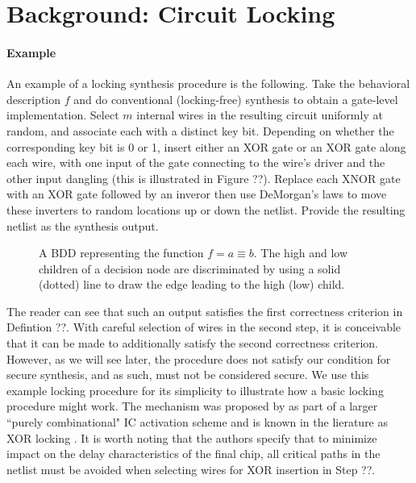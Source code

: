 \section{Background: Circuit Locking}

\paragraph{Example} An example of a locking synthesis procedure is the following. Take the behavioral description $f$ and do conventional (locking-free) synthesis to obtain a gate-level implementation. Select $m$ internal wires in the resulting circuit uniformly at random, and associate each with a distinct key bit. Depending on whether the corresponding key bit is 0 or 1, insert either an XOR gate or an XOR gate along each wire, with one input of the gate connecting to the wire's driver and the other input dangling (this is illustrated in Figure ??). Replace each XNOR gate with an XOR gate followed by an inveror then use DeMorgan's laws to move these inverters to random locations up or down the netlist. Provide the resulting netlist as the synthesis output.

\newcommand{\dummyfig}[1]{
  \centering
  \fbox{
    \begin{minipage}[c][0.20\textheight][c]{0.45\textwidth}
      \centering{#1}
    \end{minipage}
  }
}

\begin{figure}[h]
  \dummyfig{Dummy Figure Label} 
  \caption{A BDD representing the function $f = a \equiv b$. The high and low children of a decision node are discriminated by using a solid (dotted) line to draw the edge leading to the high (low) child.}
  \label{fig:dummy1}
\end{figure}

The reader can see that such an output satisfies the first correctness criterion in Defintion ??. With careful selection of wires in the second step, it is conceivable that it can be made to additionally satisfy the second correctness criterion. However, as we will see later, the procedure does not satisfy our condition for secure synthesis, and as such, must not be considered secure. We use this example locking procedure for its simplicity to illustrate how a basic locking procedure might work. The mechanism was proposed by \cite{} as part of a larger ``purely combinational" IC activation scheme and is known in the lierature as XOR locking \cite{}. It is worth noting that the authors specify that to minimize impact on the delay characteristics of the final chip, all critical paths in the netlist must be avoided when selecting wires for XOR insertion in Step ??.